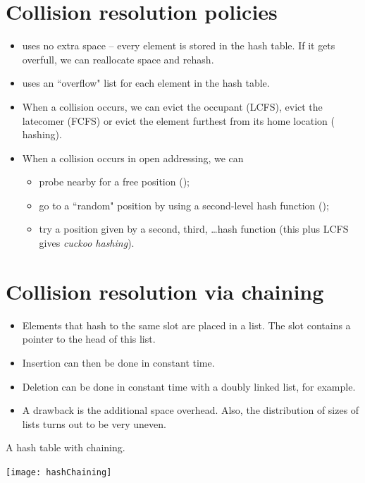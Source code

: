 \section*{Collision resolution policies}
\begin{itemize}
\item {} uses no extra space -- every element is stored in the hash table. 
If it gets overfull, we can reallocate space and {rehash}.
\item {} uses an ``overflow" list for each element in 
the hash table.
\item When a collision occurs, we can evict the occupant (LCFS), 
evict the latecomer (FCFS) or evict the element furthest from its home location
 ( hashing).
\item When a collision occurs in open addressing, we can 
	\begin{itemize}
		\item probe nearby for a free position 
		();
		\item go to a ``random" position by using a second-level hash function 
		();
		\item try a position given by a second, third, \dots hash function (this plus 
		LCFS gives \emph{cuckoo hashing}). 
	\end{itemize}
\end{itemize}


\section*{Collision resolution via chaining}
\begin{itemize}
\item Elements that hash to the same slot are placed in a list. The slot
contains a pointer to the head of this list. 
\item Insertion can then be done in constant time. 
\item Deletion can be done in constant time with a doubly linked list, for 
example. 
\item A drawback is the additional space overhead. Also, the distribution of 
sizes of lists turns out to be very uneven.
\end{itemize}

\begin{Boxample}
A hash table with chaining.
\begin{center}
\texttt{[image: hashChaining]} 
\end{center}
\end{Boxample}


